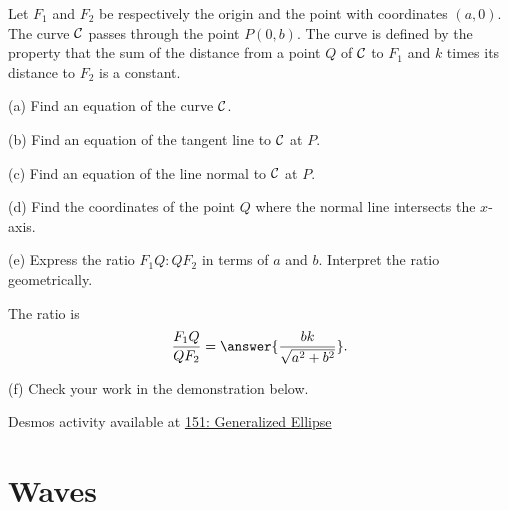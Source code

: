 \documentclass{ximera}
\begin{document}
\begin{question}  \label{Q:JDJHDHD}
Let $F_1$ and $F_2$ be respectively the origin and the point with coordinates $(a,0)$. The curve ${\cal C}$ passes through the point $P(0,b)$. The curve is defined by the property that the sum of the distance from a point $Q$ of ${\cal C}$ to $F_1$ and $k$ times its distance to $F_2$ is a constant.

(a) Find an equation of the curve ${\cal C}$.

(b) Find an equation of the tangent line to ${\cal C}$ at $P$.

(c) Find an equation of the line normal to ${\cal C}$ at $P$.

(d) Find the coordinates of the point $Q$ where the normal line intersects the $x$-axis.

(e) Express the ratio $F_1 Q : Q F_2$ in terms of $a$ and $b$. Interpret the ratio geometrically.

The ratio is
\[
    \frac{F_1 Q}{Q F_2} = \answer{\frac{bk}{\sqrt{a^2+b^2}}} . 
\]

(f) Check your work in the demonstration below.

\begin{onlineOnly}
    \begin{center}
\end{center}
\end{onlineOnly}

Desmos activity available at \href{https://www.desmos.com/calculator/uz7w5uh0vl}{151: Generalized Ellipse}


\end{question}

\section*{Waves}
\end{document}

